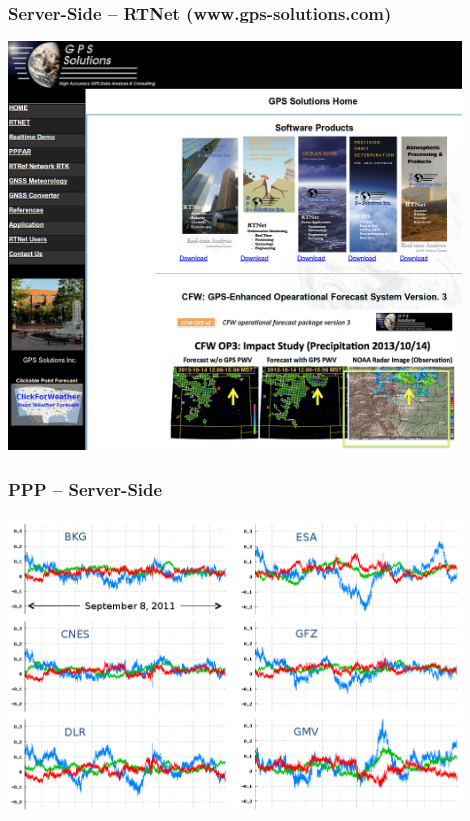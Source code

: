 \documentclass[10pt]{beamer}
\begin{document}

\begin{frame}
\frametitle{Server-Side -- RTNet (www.gps-solutions.com)}
\includegraphics[width=0.9\textwidth,angle=0]{GPSS_home.png}
\end{frame}


\begin{frame}
\frametitle{PPP -- Server-Side}
  \begin{center}
    \includegraphics[width=0.9\textwidth,angle=0]{ac_results.png}
  \end{center}
\end{frame}
\end{document}
